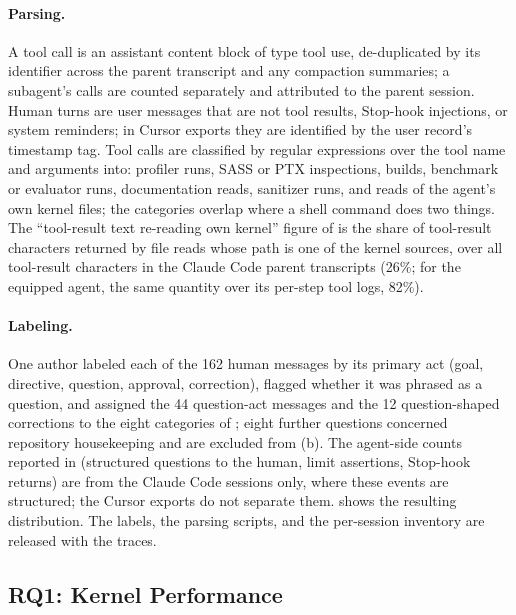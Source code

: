 \paragraph{Parsing.} A tool call is an assistant content block of type tool use, de-duplicated by
its identifier across the parent transcript and any compaction summaries; a subagent's calls are
counted separately and attributed to the parent session. Human turns are user messages that are not
tool results, Stop-hook injections, or system reminders; in Cursor exports they are identified by
the user record's timestamp tag. Tool calls are classified by regular expressions over the tool
name and arguments into: profiler runs, SASS or PTX inspections, builds, benchmark or evaluator runs,
documentation reads, sanitizer runs, and reads of the agent's own kernel files; the categories
overlap where a shell command does two things. The ``tool-result text re-reading own kernel'' figure
of  is the share of tool-result characters returned by file reads whose path is
one of the kernel sources, over all tool-result characters in the Claude Code parent transcripts
(26\%; for the equipped agent, the same quantity over its per-step tool logs, 82\%).

\paragraph{Labeling.} One author labeled each of the 162 human messages by its primary act (goal,
directive, question, approval, correction), flagged whether it was phrased as a question, and
assigned the 44 question-act messages and the 12 question-shaped corrections to the eight categories
of ; eight further questions concerned repository
housekeeping and are excluded from (b). The agent-side counts reported
in  (structured questions to the human, limit assertions, Stop-hook
returns) are from the Claude Code sessions only, where these events are structured; the Cursor
exports do not separate them.  shows the resulting distribution. The
labels, the parsing scripts, and the per-session inventory are released with the traces.

\subsection{RQ1: Kernel Performance}
\label{kernelseek:sec:eval-perf}

